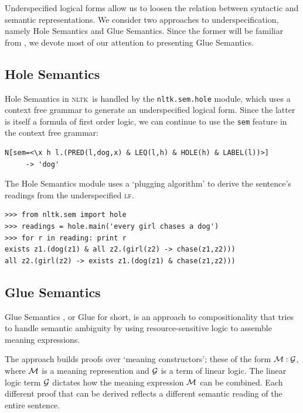 \documentclass[11pt, a4paper]{article}
\newcommand{\NLTK}{\textsc{nltk}}
\newcommand{\LF}{\textsc{lf}}
\begin{document}
Underspecified logical forms allow us to loosen the relation between
syntactic and semantic representations. We consider two approaches to
underspecification, namely Hole
Semantics and Glue Semantics. Since the former will be familiar from 
\citep{BB}, we devote most of our attention to presenting Glue
Semantics.

\subsection{Hole Semantics}

Hole Semantics in \NLTK\ is handled by the
\texttt{nltk.sem.hole} module, which uses a context free grammar to
generate an underspecified logical form.  Since the latter is itself a
formula of first order logic, we can continue to use the \texttt{sem} feature
in the context free grammar:
\begin{Verbatim}[frame=none]
N[sem=<\x h l.(PRED(l,dog,x) & LEQ(l,h) & HOLE(h) & LABEL(l))>] 
     -> 'dog'
\end{Verbatim}
The Hole Semantics module uses a `plugging algorithm' to derive the
sentence's readings from the underspecified \LF.

\begin{Verbatim}
>>> from nltk.sem import hole
>>> readings = hole.main('every girl chases a dog')
>>> for r in reading: print r
exists z1.(dog(z1) & all z2.(girl(z2) -> chase(z1,z2)))
all z2.(girl(z2) -> exists z1.(dog(z1) & chase(z1,z2)))
\end{Verbatim}


\subsection{Glue Semantics}
Glue Semantics \citep{Dalrymple:1999:RRB,Dalrymple2001}, or Glue for
short, is an approach
to compositionality that tries to handle semantic ambiguity by using resource-sensitive logic to assemble meaning
expressions.  

The approach builds proofs over `meaning constructors'; these of the
form $\cal{M}: \cal{G}$, where $\cal{M}$ is a meaning represention and
$\cal{G}$ is a term of linear logic.  The linear logic term $\cal{G}$
dictates how the meaning expression $\cal{M}$ can be combined.  Each
different proof that can be derived reflects a different semantic
reading of the entire sentence.
\end{document}

